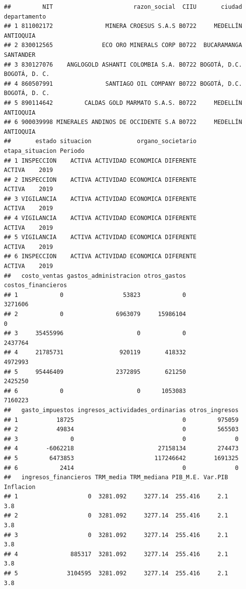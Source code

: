 \documentclass[
  11pt,
]{book}
\begin{document}
\begin{verbatim}
##         NIT                       razon_social  CIIU       ciudad  departamento
## 1 811002172               MINERA CROESUS S.A.S B0722     MEDELLÍN     ANTIOQUIA
## 2 830012565              ECO ORO MINERALS CORP B0722  BUCARAMANGA     SANTANDER
## 3 830127076    ANGLOGOLD ASHANTI COLOMBIA S.A. B0722 BOGOTÁ, D.C. BOGOTÁ, D. C.
## 4 860507991               SANTIAGO OIL COMPANY B0722 BOGOTÁ, D.C. BOGOTÁ, D. C.
## 5 890114642         CALDAS GOLD MARMATO S.A.S. B0722     MEDELLÍN     ANTIOQUIA
## 6 900039998 MINERALES ANDINOS DE OCCIDENTE S.A B0722     MEDELLÍN     ANTIOQUIA
##       estado situacion             organo_societario etapa_situacion Periodo
## 1 INSPECCION    ACTIVA ACTIVIDAD ECONOMICA DIFERENTE          ACTIVA    2019
## 2 INSPECCION    ACTIVA ACTIVIDAD ECONOMICA DIFERENTE          ACTIVA    2019
## 3 VIGILANCIA    ACTIVA ACTIVIDAD ECONOMICA DIFERENTE          ACTIVA    2019
## 4 VIGILANCIA    ACTIVA ACTIVIDAD ECONOMICA DIFERENTE          ACTIVA    2019
## 5 VIGILANCIA    ACTIVA ACTIVIDAD ECONOMICA DIFERENTE          ACTIVA    2019
## 6 INSPECCION    ACTIVA ACTIVIDAD ECONOMICA DIFERENTE          ACTIVA    2019
##   costo_ventas gastos_administracion otros_gastos costos_financieros
## 1            0                 53823            0            3271606
## 2            0               6963079     15986104                  0
## 3     35455996                     0            0            2437764
## 4     21785731                920119       418332            4972993
## 5     95446409               2372895       621250            2425250
## 6            0                     0      1053083            7160223
##   gasto_impuestos ingresos_actividades_ordinarias otros_ingresos
## 1           18725                               0         975059
## 2           49834                               0         565503
## 3               0                               0              0
## 4        -6062218                        27158134         274473
## 5         6473853                       117246642        1691325
## 6            2414                               0              0
##   ingresos_financieros TRM_media TRM_mediana PIB_M.E. Var.PIB Inflacion
## 1                    0  3281.092     3277.14  255.416     2.1       3.8
## 2                    0  3281.092     3277.14  255.416     2.1       3.8
## 3                    0  3281.092     3277.14  255.416     2.1       3.8
## 4               885317  3281.092     3277.14  255.416     2.1       3.8
## 5              3104595  3281.092     3277.14  255.416     2.1       3.8

\end{verbatim}
\end{document}
